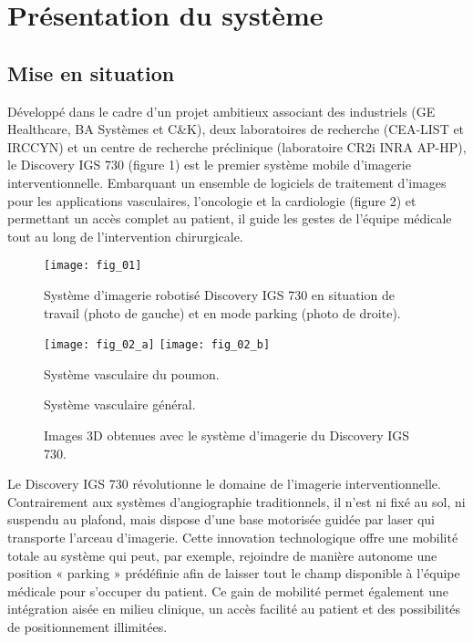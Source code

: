 
\section{Présentation du système}
\subsection{Mise en situation}
Développé dans le cadre d’un projet ambitieux associant des industriels (GE Healthcare, BA Systèmes et C\&K), deux laboratoires de recherche (CEA-LIST et IRCCYN) et un centre de recherche
préclinique (laboratoire CR2i INRA AP-HP), le Discovery IGS 730 (figure 1) est le premier système
mobile d’imagerie interventionnelle. Embarquant un ensemble de logiciels de traitement d’images
pour les applications vasculaires, l’oncologie et la cardiologie (figure 2) et permettant un accès complet au patient, il guide les gestes de l’équipe médicale tout au long de l’intervention chirurgicale.

\begin{figure}[!h]
\centering
\texttt{[image: fig\_01]}
\caption{\label{fig:01}  Système d’imagerie robotisé Discovery IGS 730 en situation de travail (photo de gauche) et en mode parking (photo de droite).}
\end{figure}


\begin{figure}[!h]
\centering
\texttt{[image: fig\_02\_a]}
\texttt{[image: fig\_02\_b]}
\caption{\label{fig:02a} Système vasculaire du poumon.}
\caption{\label{fig:02b} Système vasculaire général.}
\caption{\label{fig:02}  Images 3D obtenues avec le système d’imagerie du Discovery IGS 730.}
\end{figure}

Le Discovery IGS 730 révolutionne le domaine de l’imagerie interventionnelle. Contrairement aux
systèmes d’angiographie traditionnels, il n’est ni fixé au sol, ni suspendu au plafond, mais dispose
d’une base motorisée guidée par laser qui transporte l’arceau d’imagerie. Cette innovation technologique offre une mobilité totale au système qui peut, par exemple, rejoindre de manière autonome
une position « parking » prédéfinie afin de laisser tout le champ disponible à l’équipe médicale pour
s’occuper du patient. Ce gain de mobilité permet également une intégration aisée en milieu clinique,
un accès facilité au patient et des possibilités de positionnement illimitées.


